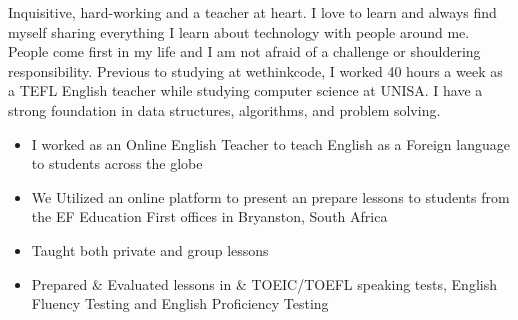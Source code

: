 \documentclass[10pt,a4paper]{altacv}
\begin{document}


\begin{adjustwidth}{6cm}{-8cm}
\makecvheader
\end{adjustwidth}


Inquisitive, hard-working and a teacher at heart. I love to learn and always find myself sharing everything I learn about technology with people around me. People come first in my life and I am not afraid of a challenge or shouldering responsibility. Previous to studying at wethinkcode, I worked 40 hours a week as a TEFL English teacher while studying computer science at UNISA. I have a strong foundation in data structures, algorithms, and problem solving.


\begin{itemize}
\item I worked as an Online English Teacher to teach English as a Foreign language to students across the globe
\item We Utilized an online platform to present an prepare lessons to students from the EF Education First offices in
Bryanston, South Africa
\item Taught both private and group lessons
\item Prepared \& Evaluated lessons in \& TOEIC/TOEFL speaking  tests, English Fluency Testing and English Proficiency Testing

\end{itemize}
\end{document}
